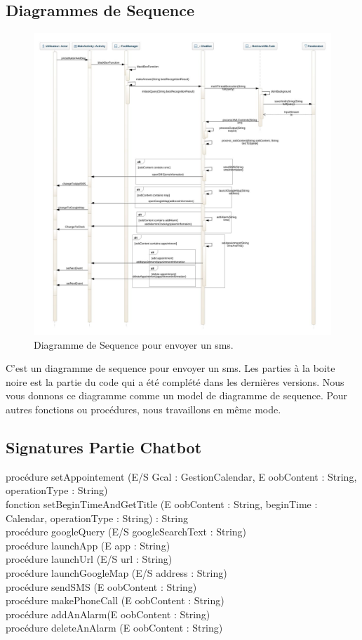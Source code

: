 \subsection{Diagrammes de Sequence}
\begin{figure}[h]
\centering
\includegraphics[scale=0.4]{./diagrammes/SequenceDiagram.jpeg}
\caption{Diagramme de Sequence pour envoyer un sms.\label{fig3}}
\end{figure}
\indent C'est un diagramme de sequence pour envoyer un sms. Les parties à la boite noire est la partie du code qui a été complété dans les dernières versions. Nous vous donnons ce diagramme comme un model de diagramme de sequence. Pour autres fonctions ou procédures, nous travaillons en même mode.
\newpage
\newpage


\subsection{Signatures Partie Chatbot}
procédure setAppointement (E/S Gcal : GestionCalendar, E oobContent : String, operationType : String)\\
\indent fonction setBeginTimeAndGetTitle (E oobContent : String, beginTime : Calendar, operationType : String) : String\\
\indent procédure googleQuery (E/S googleSearchText : String)\\
\indent procédure launchApp (E app : String)\\
\indent procédure launchUrl (E/S url : String)\\
\indent procédure launchGoogleMap (E/S address : String)\\
\indent procédure sendSMS (E oobContent : String)\\
\indent procédure makePhoneCall (E oobContent : String)\\
\indent procédure addAnAlarm(E oobContent : String)\\
\indent procédure deleteAnAlarm (E oobContent : String)\\

